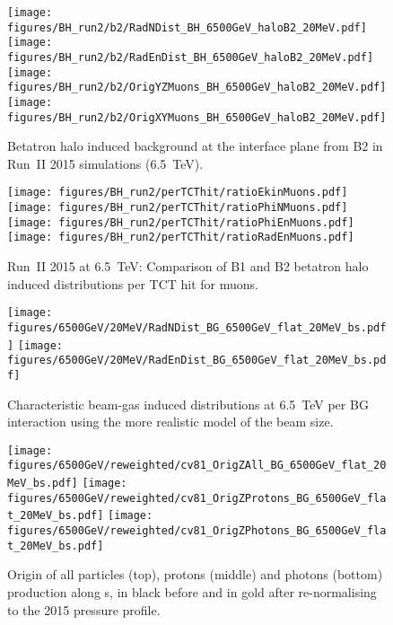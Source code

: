 \begin{figure}%
\centering
\texttt{[image: figures/BH\_run2/b2/RadNDist\_BH\_6500GeV\_haloB2\_20MeV.pdf]}
\texttt{[image: figures/BH\_run2/b2/RadEnDist\_BH\_6500GeV\_haloB2\_20MeV.pdf]}
\texttt{[image: figures/BH\_run2/b2/OrigYZMuons\_BH\_6500GeV\_haloB2\_20MeV.pdf]}
\texttt{[image: figures/BH\_run2/b2/OrigXYMuons\_BH\_6500GeV\_haloB2\_20MeV.pdf]}
 \caption{Betatron halo induced background at the interface plane from B2 in Run~II 2015 simulations (6.5~TeV). 
  \label{dist6500GeVB22}}
\end{figure}

\begin{figure}%
\begin{center}
  \texttt{[image: figures/BH\_run2/perTCThit/ratioEkinMuons.pdf]}
  \texttt{[image: figures/BH\_run2/perTCThit/ratioPhiNMuons.pdf]}
  \texttt{[image: figures/BH\_run2/perTCThit/ratioPhiEnMuons.pdf]}
  \texttt{[image: figures/BH\_run2/perTCThit/ratioRadEnMuons.pdf]}
\end{center}
\vspace{-0.6cm}
 \caption{Run~II 2015 at 6.5~TeV: Comparison of B1 and B2 betatron halo induced distributions per TCT hit for muons.
  \label{compBHB1B2run22}}
\end{figure}

\clearpage

\begin{figure}%
\begin{center}
  \texttt{[image: figures/6500GeV/20MeV/RadNDist\_BG\_6500GeV\_flat\_20MeV\_bs.pdf]}
  \texttt{[image: figures/6500GeV/20MeV/RadEnDist\_BG\_6500GeV\_flat\_20MeV\_bs.pdf]}
\end{center}
\vspace{-0.6cm}
 \caption{Characteristic beam-gas induced distributions at 6.5~TeV per BG interaction using the more realistic model of the beam size.
  \label{bg65002}}
\end{figure}

\begin{figure}
\begin{center}
  \texttt{[image: figures/6500GeV/reweighted/cv81\_OrigZAll\_BG\_6500GeV\_flat\_20MeV\_bs.pdf]}
  \texttt{[image: figures/6500GeV/reweighted/cv81\_OrigZProtons\_BG\_6500GeV\_flat\_20MeV\_bs.pdf]}
  \texttt{[image: figures/6500GeV/reweighted/cv81\_OrigZPhotons\_BG\_6500GeV\_flat\_20MeV\_bs.pdf]}
\end{center}
\vspace{-0.6cm}
 \caption{Origin of all particles (top), protons (middle) and photons (bottom) production along s, in black before and in gold after re-normalising to the 2015 pressure profile. 
  \label{fig:OrigZ6p52}}
\end{figure}


